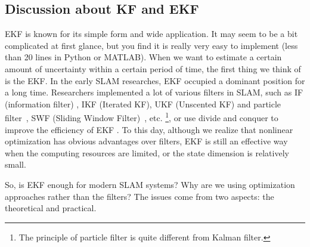 \subsection{Discussion about KF and EKF}
EKF is known for its simple form and wide application. It may seem to be a bit complicated at first glance, but you find it is really very easy to implement (less than 20 lines in Python or MATLAB).  When we want to estimate a certain amount of uncertainty within a certain period of time, the first thing we think of is the EKF. In the early SLAM researches, EKF occupied a dominant position for a long time. Researchers implemented a lot of various filters in SLAM, such as IF (information filter) {\cite{Sujan2005} }, IKF {\cite{Janabi-Sharifi2010}} (Iterated KF), UKF {\cite{Li2010}} (Unscented KF) and particle filter~\cite{Sim2007, Lee2011, Gil2010a}, SWF (Sliding Window \mbox{Filter) {\cite{Sibley2010}}}, etc. {\cite{Chen2012}} \footnote{The principle of particle filter is quite different from Kalman filter. }, or use divide and conquer to improve the efficiency of EKF {\cite{Paz2008, Grasa2011}}. To this day, although we realize that nonlinear optimization has obvious advantages over filters, EKF is still an effective way when the computing resources are limited, or the state dimension is relatively small.

So, is EKF enough for modern SLAM systems? Why are we using optimization approaches rather than the filters? The issues come from two aspects: the theoretical and practical. 


